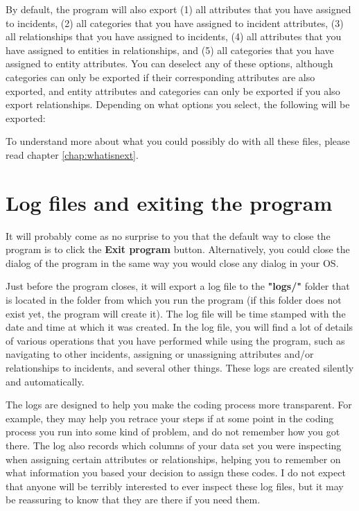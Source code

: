 \documentclass{memoir}
\begin{document}
By default, the program will also export (1) all attributes that you have assigned to incidents, (2) all categories that you have assigned to incident attributes, (3) all relationships that you have assigned to incidents, (4) all attributes that you have assigned to entities in relationships, and (5) all categories that you have assigned to entity attributes. You can deselect any of these options, although categories can only be exported if their corresponding attributes are also exported, and entity attributes and categories can only be exported if you also export relationships. Depending on what options you select, the following will be exported:

To understand more about what you could possibly do with all these files, please read chapter \ref{chap:whatisnext}.


\section{Log files and exiting the program}
\label{sec:logfilesandexiting}

It will probably come as no surprise to you that the default way to close the program is to click the \textbf{Exit program} button. Alternatively, you could close the dialog of the program in the same way you would close any dialog in your OS.

Just before the program closes, it will export a log file to the \textbf{"logs/"} folder that is located in the folder from which you run the program (if this folder does not exist yet, the program will create it). The log file will be time stamped with the date and time at which it was created. In the log file, you will find a lot of details of various operations that you have performed while using the program, such as navigating to other incidents, assigning or unassigning attributes and/or relationships to incidents, and several other things. These logs are created silently and automatically.

The logs are designed to help you make the coding process more transparent. For example, they may help you retrace your steps if at some point in the coding process you run into some kind of problem, and do not remember how you got there. The log also records which columns of your data set you were inspecting when assigning certain attributes or relationships, helping you to remember on what information you based your decision to assign these codes. I do not expect that anyone will be terribly interested to ever inspect these log files, but it may be reassuring to know that they are there if you need them.  
\end{document}

